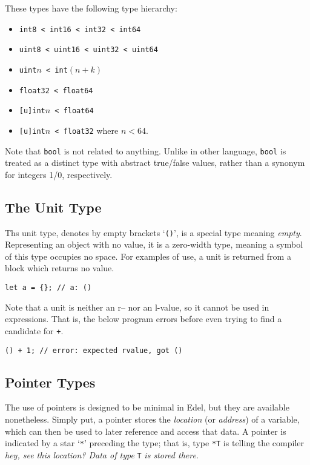 \documentclass{article}
\begin{document}

    These types have the following type hierarchy:
    \begin{itemize}
        \item \texttt{int8 < int16 < int32 < int64}
        \item \texttt{uint8 < uint16 < uint32 < uint64}
        \item \texttt{uint\(n\) < int\((n+k)\)}
        \item \texttt{float32 < float64}
        \item \texttt{[u]int\(n\) < float64}
        \item \texttt{[u]int\(n\) < float32} where \(n < 64\).
    \end{itemize}

    Note that \texttt{bool} is not related to anything.
    Unlike in other language, \texttt{bool} is treated as a distinct type with abstract true/false values, rather than a synonym for integers 1/0, respectively.

    \subsection{The Unit Type}

    Ths unit type, denotes by empty brackets `\texttt{()}', is a special type meaning \textit{empty}.
    Representing an object with no value, it is a zero-width type, meaning a symbol of this type occupies no space.
    For examples of use, a unit is returned from a block which returns no value.

    \begin{lstlisting}[language=CustomLang]
let a = {}; // a: ()
    \end{lstlisting}

    Note that a unit is neither an r-- nor an l-value, so it cannot be used in expressions.
    That is, the below program errors before even trying to find a candidate for \texttt{+}.

    \begin{lstlisting}[language=CustomLang]
() + 1; // error: expected rvalue, got ()
    \end{lstlisting}

    \subsection{Pointer Types}\label{subsec:pointer-types}

    The use of pointers is designed to be minimal in Edel, but they are available nonetheless.
    Simply put, a pointer stores the \textit{location} (or \textit{address}) of a variable, which can then be used to later reference and access that data.
    A pointer is indicated by a star `\texttt{*}' preceding the type;
    that is, type \texttt{*T} is telling the compiler \textit{hey, see this location? Data of type} \texttt{T} \textit{is stored there}.
\end{document}
